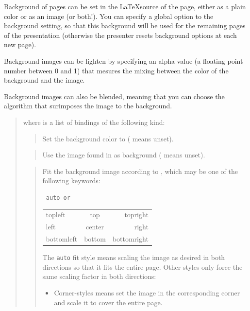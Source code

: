 \documentclass[12pt]{article}
\begin{document}
Background of pages can be set in the \LaTeX source of the page,
either as a plain color or as an image (or both!).
You can specify a global option to the background setting, so that this
background will be used for the remaining pages of the presentation
(otherwise the presenter resets background options at each new page).

Background images can be lighten by specifying an alpha value (a
floating point number between 0 and 1) that mesures the mixing
between the color of the background and the image.

Background images can also be blended, meaning that you can choose the
algorithm that surimposes the image to the background.

\medskip\noindent
\docdef \advibg \doctt {[global]}
\begin{quote}
where  is a list of bindings of the following kind:

\begin{quote}
Set the background color to 
( means unset).
\end{quote}

\begin{quote}
Use the image found in  as background ( means unset).
\end{quote}

\begin{quote}
Fit the background image according to , which may be 
one of the following keywords:
\begin{center}
\tt
auto \hfill {\rm or} \hfill
\begin{tabular}{l@{\qquad}c@{\qquad}r}
topleft&   top& topright\\
left&  center&  right \\
bottomleft& bottom & bottomright\\
\end{tabular}
\end{center}
The {\tt auto} fit style means scaling the image as desired in both directions
so that it fits the entire page. Other styles only force the same scaling
factor in both directions:
\begin {itemize}

\item Corner-styles means set the image in the corresponding corner
and scale it to cover the entire page.


\end{itemize}
\end{quote}
\end{quote}
\end{document}
